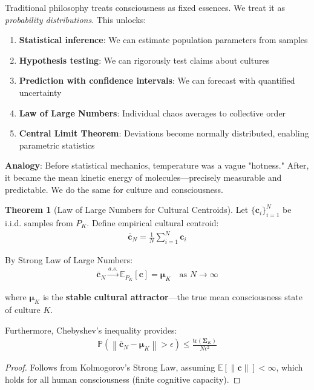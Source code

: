 \documentclass[11pt,a4paper]{article}
\theoremstyle{definition}
\newtheorem{theorem}{Theorem}[section]
\theoremstyle{remark}
\newcommand{\cc}{\mathbf{c}}
\newcommand{\norm}[1]{\left\|#1\right\|}
\begin{document}
\begin{small}
\begin{mdframed}[backgroundcolor=yellow!10,linewidth=2pt]
Traditional philosophy treats consciousness as fixed essences. We treat it as \textit{probability distributions}. This unlocks:

\begin{enumerate}[nosep]
    \item \textbf{Statistical inference}: We can estimate population parameters from samples
    \item \textbf{Hypothesis testing}: We can rigorously test claims about cultures
    \item \textbf{Prediction with confidence intervals}: We can forecast with quantified uncertainty
    \item \textbf{Law of Large Numbers}: Individual chaos averages to collective order
    \item \textbf{Central Limit Theorem}: Deviations become normally distributed, enabling parametric statistics
\end{enumerate}

\textbf{Analogy}: Before statistical mechanics, temperature was a vague "hotness." After, it became the mean kinetic energy of molecules—precisely measurable and predictable. We do the same for culture and consciousness.
\end{mdframed}

\begin{theorem}[Law of Large Numbers for Cultural Centroids]
Let \(\{\cc_i\}_{i=1}^N\) be i.i.d. samples from \(P_K\). Define empirical cultural centroid:
\begin{align}
\bar{\cc}_N = \frac{1}{N} \sum_{i=1}^N \cc_i
\end{align}

By Strong Law of Large Numbers:
\begin{align}
\bar{\cc}_N \xrightarrow{a.s.} \mathbb{E}_{P_K}[\cc] = \boldsymbol{\mu}_K \quad \text{as } N \to \infty
\end{align}

where \(\boldsymbol{\mu}_K\) is the \textbf{stable cultural attractor}—the true mean consciousness state of culture \(K\).

Furthermore, Chebyshev's inequality provides:
\begin{align}
\mathbb{P}\left(\norm{\bar{\cc}_N - \boldsymbol{\mu}_K} > \epsilon\right) \leq \frac{\text{tr}(\boldsymbol{\Sigma}_K)}{N\epsilon^2}
\end{align}
\end{theorem}

\begin{proof}
Follows from Kolmogorov's Strong Law, assuming \(\mathbb{E}[\norm{\cc}] < \infty\), which holds for all human consciousness (finite cognitive capacity). 


\end{proof}
\end{small}
\end{document}
